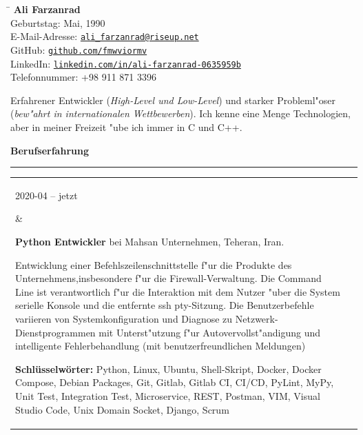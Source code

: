 \documentclass[11pt,a4paper,oneside]{article}
\makeatletter
\newcommand{\https}[1]{\href{https://#1}{\nolinkurl{#1}}}
\newcommand{\mailto}[1]{\href{mailto://#1}{\nolinkurl{#1}}}
\newcommand{\keywords}[1]{\textbf{Schl\"{u}sselw\"{o}rter:} #1}
\renewcommand{\section}[1]{%
{\large\textbf{#1}}\\
\rule[9pt]{18cm}{.4pt}\vspace{-16pt}%
}
\newenvironment{mytable}{%
\begin{tabular}{@{}l@{\hspace{4mm}}l@{}}%
}{\end{tabular}}
\newcommand{\myitem}[2]{%
\parbox[t]{16mm}{#1}&\parbox[t]{16cm}{#2}\\%
}
\makeatother
\begin{document}
%
%
\hspace{1cm}%
\parbox{13cm}{%
\begin{tabbing}%
\hspace{3cm}\=\kill%
\textbf{{\LARGE Ali Farzanrad}}\\[5mm]
Geburtstag:  Mai, 1990\\[1mm]
E-Mail-Adresse: \>
\mailto{ali_farzanrad@riseup.net}\\[1mm]
GitHub: \>
\https{github.com/fmwviormv}\\[1mm]
LinkedIn: \>
\https{linkedin.com/in/ali-farzanrad-0635959b}\\[1mm]
Telefonnummer: \>
{+}98{ }911{ }871{ }3396\\
\end{tabbing}%
}

\vspace{-9pt}%
Erfahrener Entwickler (\textit{High-Level und Low-Level}) und starker
Probleml"oser (\textit{bew"ahrt in internationalen Wettbewerben}).
Ich kenne eine Menge Technologien, aber in meiner Freizeit "ube
ich immer in C und C++.

\section{Berufserfahrung}

\begin{mytable}
\myitem{2020-04 -- jetzt}{%
\textbf{Python Entwickler} bei
Mahsan Unternehmen, Teheran, Iran.

Entwicklung einer Befehlszeilenschnittstelle f"ur die Produkte
des Unternehmens,insbesondere f"ur die Firewall-Verwaltung.
Die Command Line ist verantwortlich f"ur die Interaktion mit dem Nutzer
"uber die System serielle Konsole und die entfernte ssh pty-Sitzung.
Die Benutzerbefehle variieren von Systemkonfiguration und Diagnose
zu Netzwerk-Dienstprogrammen mit Unterst"utzung
f"ur Autovervollst"andigung und intelligente Fehlerbehandlung
(mit benutzerfreundlichen Meldungen)

\keywords{%
	Python, Linux, Ubuntu, Shell-Skript, Docker, Docker Compose,
	Debian Packages, Git, Gitlab, Gitlab CI, CI/CD, PyLint, MyPy,
	Unit Test, Integration Test, Microservice, REST, Postman,
	VIM, Visual Studio Code, Unix Domain Socket, Django, Scrum
}
}
\end{mytable}
\end{document}
